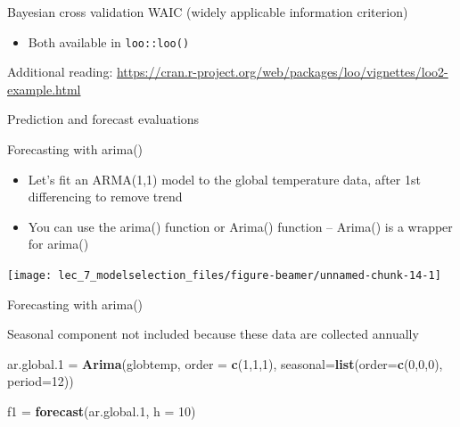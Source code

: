 \documentclass[ignorenonframetext,]{beamer}
\newenvironment{Shaded}{\begin{snugshade}}{\end{snugshade}}
\newcommand{\DataTypeTok}[1]{\textcolor[rgb]{0.13,0.29,0.53}{#1}}
\newcommand{\DecValTok}[1]{\textcolor[rgb]{0.00,0.00,0.81}{#1}}
\newcommand{\FloatTok}[1]{\textcolor[rgb]{0.00,0.00,0.81}{#1}}
\newcommand{\KeywordTok}[1]{\textcolor[rgb]{0.13,0.29,0.53}{\textbf{#1}}}
\newcommand{\NormalTok}[1]{#1}
\newcommand{\StringTok}[1]{\textcolor[rgb]{0.31,0.60,0.02}{#1}}
\providecommand{\tightlist}{%
  \setlength{\itemsep}{0pt}\setlength{\parskip}{0pt}}
\begin{document}
\begin{frame}[fragile]
\begin{block}{Bayesian cross validation}
WAIC (widely applicable information criterion)

\begin{itemize}
\tightlist
\item
  Both available in \texttt{loo::loo()}
\end{itemize}

Additional reading:
\url{https://cran.r-project.org/web/packages/loo/vignettes/loo2-example.html}

\end{block}

\begin{block}{Prediction and forecast evaluations}

\end{block}

\begin{block}{Forecasting with arima()}

\begin{itemize}
\item
  Let's fit an ARMA(1,1) model to the global temperature data, after 1st
  differencing to remove trend
\item
  You can use the arima() function or Arima() function -- Arima() is a
  wrapper for arima()
\end{itemize}

\begin{center}\texttt{[image: lec\_7\_modelselection\_files/figure-beamer/unnamed-chunk-14-1]} \end{center}

\end{block}

\begin{block}{Forecasting with arima()}

Seasonal component not included because these data are collected
annually

\begin{Shaded}
\begin{Highlighting}[]
\NormalTok{ar.global}\FloatTok{.1}\NormalTok{ =}\StringTok{ }\KeywordTok{Arima}\NormalTok{(globtemp, }\DataTypeTok{order =} \KeywordTok{c}\NormalTok{(}\DecValTok{1}\NormalTok{,}\DecValTok{1}\NormalTok{,}\DecValTok{1}\NormalTok{),}
              \DataTypeTok{seasonal=}\KeywordTok{list}\NormalTok{(}\DataTypeTok{order=}\KeywordTok{c}\NormalTok{(}\DecValTok{0}\NormalTok{,}\DecValTok{0}\NormalTok{,}\DecValTok{0}\NormalTok{),}
              \DataTypeTok{period=}\DecValTok{12}\NormalTok{))}

\NormalTok{f1 =}\StringTok{ }\KeywordTok{forecast}\NormalTok{(ar.global}\FloatTok{.1}\NormalTok{, }\DataTypeTok{h =} \DecValTok{10}\NormalTok{)}
\end{Highlighting}
\end{Shaded}


\end{block}
\end{frame}
\end{document}
